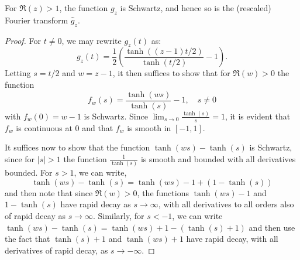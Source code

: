     \begin{rem}
        For $\Re(z) > 1$, the function $g_z$ is Schwartz, and hence so is the (rescaled) Fourier transform $\widehat{g}_z$. 
    \end{rem}
    \begin{proof}
        For $t \neq 0$, we may rewrite $g_z(t)$ as:
        \begin{equation*}
            g_z(t) = \frac{1}{2}\left(\frac{\tanh((z-1)t/2)}{\tanh(t/2)}-1\right).
        \end{equation*}
        Letting $s = t/2$ and $w = z-1$, it then suffices to show that for $\Re(w) > 0$ the function
        \begin{equation*}
            f_w(s) = \frac{\tanh(ws)}{\tanh(s)}-1,\quad s\neq 0
        \end{equation*}
        with $f_w(0) = w-1$ is Schwartz. Since $\lim_{s\to 0} \frac{\tanh(s)}{s} = 1$, it is evident that $f_w$ is continuous at $0$
        and that $f_w$ is smooth in $[-1,1]$. 
        
        It suffices now to show that the function $\tanh(ws)-\tanh(s)$ is Schwartz, since for $|s| > 1$ the function $\frac{1}{\tanh(s)}$ is 
        smooth and bounded with all derivatives bounded. For $s > 1$, we can write,
        \begin{equation*}
            \tanh(ws)-\tanh(s) = \tanh(ws)-1+(1-\tanh(s))
        \end{equation*}
        and then note that since $\Re(w) > 0$, the functions $\tanh(ws)-1$ and $1-\tanh(s)$ have rapid decay as $s\to\infty$, with all derivatives to all orders also of rapid decay as $s\to\infty$. Similarly, for $s < -1$, we
        can write $\tanh(ws)-\tanh(s) = \tanh(ws)+1-(\tanh(s)+1)$ and then use the fact that $\tanh(s)+1$ and $\tanh(ws)+1$ have rapid decay, with all derivatives of rapid decay, as $s\to-\infty$. 
    \end{proof}
    
    
    
% 

